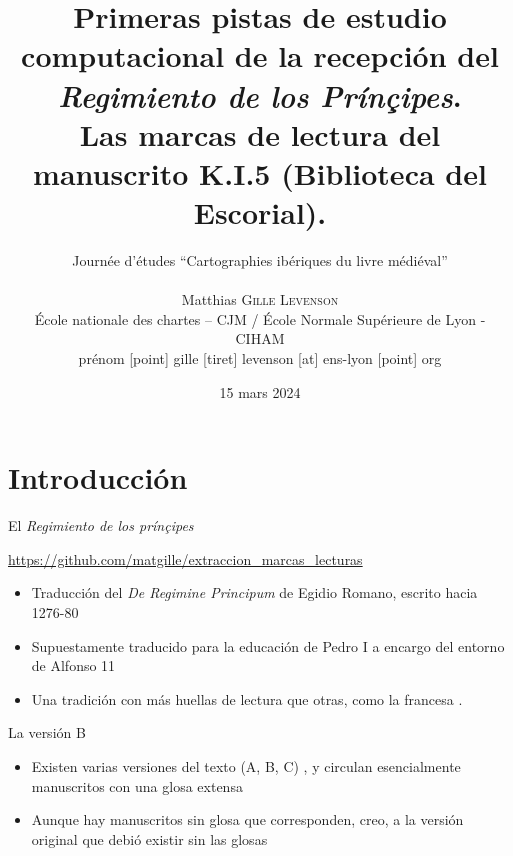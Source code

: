 \documentclass[11pt,aspectratio=169]{beamer}
\date[15/03/2024]{15 mars 2024}
\author[Matthias \textsc{Gille Levenson}]{{\Large Journée d'études \enquote{Cartographies ibériques du livre médiéval}}\\~\\ Matthias \textsc{Gille Levenson}\\   {\scriptsize École nationale des chartes -- CJM / École Normale Supérieure de Lyon - CIHAM}\\ {\tiny prénom [point] gille [tiret] levenson [at] ens-lyon [point] org}\vspace{-1cm}}
\title[Las marcas de lectura del mss. K.I.5]{Primeras pistas de estudio computacional de la recepción del \textit{Regimiento de los Prínçipes}.\\ \normalsize Las marcas de lectura del manuscrito K.I.5 (Biblioteca del Escorial).}
\begin{document}
\maketitle





\begin{frame}
\tableofcontents %
\end{frame}


\section*{Introducción}
\begin{frame}{El \textit{Regimiento de los prínçipes}}
\begin{center}
\url{https://github.com/matgille/extraccion_marcas_lecturas}
\begin{itemize}
\item Traducción del \textit{De Regimine Principum} de Egidio Romano, escrito hacia 1276-80
\item Supuestamente traducido para la educación de Pedro I a encargo del entorno de Alfonso 11
\item Una tradición con más huellas de lectura que otras, como la francesa \parencite{perret_les_2011}.
\end{itemize}
\end{center}
\end{frame}


\begin{frame}{La versión B}
\begin{itemize}
\item Existen varias versiones del texto (A, B, C) \parencite{acero-durantez_VersionesTraduccionCastellana_2005}, y circulan esencialmente manuscritos con una glosa extensa
\item Aunque hay manuscritos sin glosa que corresponden, creo, a la versión original que debió existir sin las glosas \parencite{gillelevenson_RegimientoPrincipesSa_2023}
\end{itemize}
\end{frame}
\end{document}
